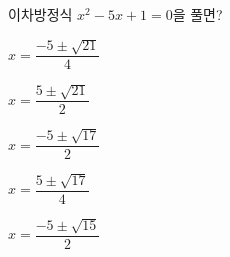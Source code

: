 이차방정식 $x^2-5x+1=0$을 풀면?
\begin{choicesii}{\rule[-3ex]{0pt}{8ex}$x=\dfrac{-5\pm\sqrt{21}}{4}$}{\rule[-3ex]{0pt}{8ex}$x=\dfrac{5\pm\sqrt{21}}{2}$}{\rule[-3ex]{0pt}{8ex}$x=\dfrac{-5\pm\sqrt{17}}{2}$}{\rule[-3ex]{0pt}{8ex}$x=\dfrac{5\pm\sqrt{17}}{4}$}{\rule[-3ex]{0pt}{8ex}$x=\dfrac{-5\pm\sqrt{15}}{2}$}\end{choicesii}
